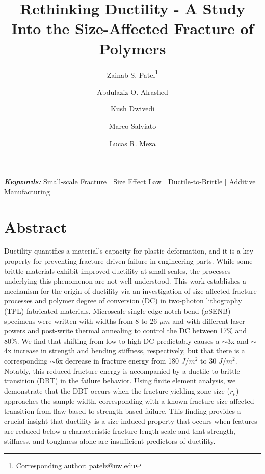 \documentclass[11pt]{article}
\providecommand{\um}[0]{$\mu m$}
\providecommand{\uSENB}[0]{$\mu$SENB}
\providecommand{\rp}[0]{$r_p$}
\providecommand{\keywords}[1]{\textbf{\textit{Keywords:}} #1}
\begin{document}
    \title{Rethinking Ductility - A Study Into the Size-Affected Fracture of Polymers}
    
    \author[a]{Zainab S. Patel\thanks{Corresponding author: patelz@uw.edu}}
    \author[b]{Abdulaziz O. Alrashed}
    \author[b]{Kush Dwivedi}
    \author[c]{Marco Salviato}
    \author[b]{Lucas R. Meza} 
    
    \date{}
    \maketitle

    \keywords{Small-scale Fracture $|$ Size Effect Law $|$ Ductile-to-Brittle $|$ Additive Manufacturing} 
    
    \section*{Abstract}
        Ductility quantifies a material's capacity for plastic deformation, and it is a key property for preventing fracture driven failure in engineering parts.
        While some brittle materials exhibit improved ductility at small scales, the processes underlying this phenomenon are not well understood.
        This work establishes a mechanism for the origin of ductility via an investigation of size-affected fracture processes and polymer degree of conversion (DC) in two-photon lithography (TPL) fabricated materials.
        Microscale single edge notch bend (\uSENB) specimens were written with widths from 8 to 26 \um{} and with different laser powers and post-write thermal annealing to control the DC between 17\% and 80\%.
        We find that shifting from low to high DC predictably causes a $\sim$3x and $\sim$4x increase in strength and bending stiffness, respectively, but that there is a corresponding $\sim$6x decrease in fracture energy from 180 $J/m^2$ to 30 $J/m^2$.
        Notably, this reduced fracture energy is accompanied by a ductile-to-brittle transition (DBT) in the failure behavior.
        Using finite element analysis, we demonstrate that the DBT occurs when the fracture yielding zone size (\rp{}) approaches the sample width, corresponding with a known fracture size-affected transition from flaw-based to strength-based failure.
        This finding provides a crucial insight that ductility is a size-induced property that occurs when features are reduced below a characteristic fracture length scale and that strength, stiffness, and toughness alone are insufficient predictors of ductility.
    
\end{document}
